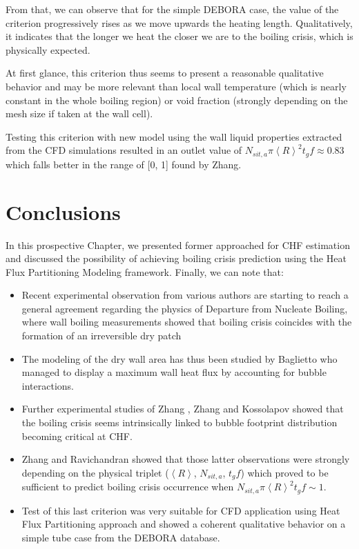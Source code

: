 \npar

From that, we can observe that for the simple DEBORA case, the value of the criterion progressively rises as we move upwards the heating length. Qualitatively, it indicates that the longer we heat the closer we are to the boiling crisis, which is physically expected. 

\npar

At first glance, this criterion thus seems to present a reasonable qualitative behavior and may be more relevant than local wall temperature (which is nearly constant in the whole boiling region) or void fraction (strongly depending on the mesh size if taken at the wall cell).

\begin{remark*}{}
Testing this criterion with new model using the wall liquid properties extracted from the CFD simulations resulted in an outlet value of $N_{sit,a} \pi \left<R\right>^{2} t_{g}f \approx 0.83$ which falls better in the range of [0, 1] found by Zhang.
\end{remark*}


\section{Conclusions}

In this prospective Chapter, we presented former approached for CHF estimation and discussed the possibility of achieving boiling crisis prediction using the Heat Flux Partitioning Modeling framework. Finally, we can note that:

\begin{itemize}
\item Recent experimental observation from various authors are starting to reach a general agreement regarding the physics of Departure from Nucleate Boiling, where wall boiling measurements showed that boiling crisis coincides with the formation of an irreversible dry patch

\item The modeling of the dry wall area has thus been studied by Baglietto \etal \cite{baglietto_boiling_2019} who managed to display a maximum wall heat flux by accounting for bubble interactions.

\item Further experimental studies of Zhang \etal \cite{zhang_percolative_2019}, Zhang \cite{zhang_new_2022} and Kossolapov \cite{kossolapov_experimental_2021} showed that the boiling crisis seems intrinsically linked to bubble footprint distribution becoming critical at CHF.  

\item Zhang \cite{zhang_new_2022} and Ravichandran \etal \cite{ravichandran_infrared_2022} showed that those latter observations were strongly depending on the physical triplet ($\left<R\right>$, $N_{sit,a}$, $t_{g}f$) which proved to be sufficient to predict boiling crisis occurrence when $N_{sit,a} \pi \left<R\right>^{2} t_{g}f \sim 1$.

\item Test of this last criterion was very suitable for CFD application using Heat Flux Partitioning approach and showed a coherent qualitative behavior on a simple tube case from the DEBORA database.
\end{itemize}
